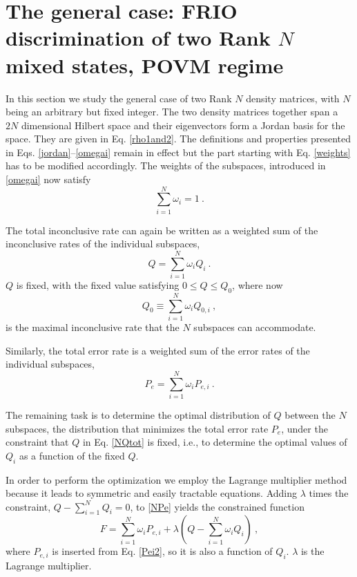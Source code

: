 \documentclass[aps,pra,twocolumn,eqsecnum,showpacs]{revtex4}
\begin{document}
\section{The general case: FRIO discrimination of two Rank $N$ mixed states, POVM regime}
\label{sec:4}

In this section we study the general case of two Rank $N$ density matrices, with $N$ being an arbitrary but fixed integer.  The two density matrices together span a $2N$ dimensional Hilbert space and their eigenvectors form a Jordan basis for the space. They are given in Eq. \eqref{rho1and2}.
The definitions and properties presented in Eqs. \eqref{jordan}--\eqref{omegai} remain  in effect but the part starting with Eq. \eqref{weights} has to be modified accordingly.
The weights of the subspaces, introduced in \eqref{omegai} now satisfy 
\begin{equation}
\sum_{i=1}^{N}\omega_{i} = 1 \ .
\label{Nweights}
\end{equation} 

The total inconclusive rate can again be written as a weighted sum of the inconclusive rates of the individual subspaces,
\begin{equation}
Q = \sum_{i=1}^{N}\omega_{i} Q_{i} \ .
\label{NQtot}
\end{equation}
$Q$ is fixed, with the fixed value satisfying $0 \leq Q \leq Q_{0}$, where now
\begin{equation}
Q_{0} \equiv \sum_{i=1}^{N}\omega_{i}Q_{0,i} \ , 
\label{NQ0}
\end{equation}
is the maximal inconclusive rate that the $N$ subspaces can accommodate.

Similarly, the total error rate is a weighted sum of the error rates of the individual subspaces,
\begin{equation}
P_{e} = \sum_{i=1}^{N}\omega_{i} P_{e,i} \ .
\label{NPe}
\end{equation}

The remaining task is to determine the optimal distribution of $Q$ between the $N$ subspaces, the distribution that minimizes the total error rate $P_{e}$, under the constraint that $Q$ in Eq. \eqref{NQtot} is fixed, i.e., to determine the optimal values of $Q_i$ as a function of the fixed $Q$. 

In order to perform the optimization we employ the Lagrange multiplier method because it leads to symmetric and easily tractable equations.  Adding $\lambda$ times the constraint, $Q -\sum_{i=1}^{N} Q_i = 0$, to \eqref{NPe} yields the constrained function
\begin{equation}
F = \sum_{i=1}^{N}\omega_{i}P_{e,i} + \lambda (Q - \sum_{i=1}^{N} \omega_{i}Q_i) \ ,
\label{constrainedF}
\end{equation}
where $P_{e,i}$ is inserted from Eq. \eqref{Pei2}, so it is also a function of $Q_{i}$. $\lambda$ is the Lagrange multiplier. 
\end{document}
